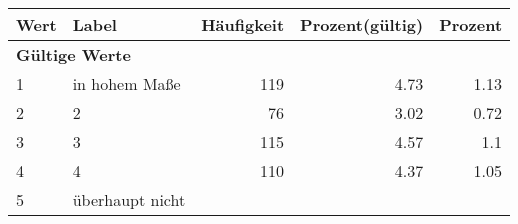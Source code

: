      \begin{longtable}{lXrrr}
     \toprule
     \textbf{Wert} & \textbf{Label} & \textbf{Häufigkeit} & \textbf{Prozent(gültig)} & \textbf{Prozent} \\
     \endhead
     \midrule
     \multicolumn{5}{l}{\textbf{Gültige Werte}}\\

     1 &
     \multicolumn{1}{X}{ in hohem Maße   } &


       \num{119} &
       \num[round-mode=places,round-precision=2]{4.73} &
         \num[round-mode=places,round-precision=2]{1.13} \\

     2 &
     \multicolumn{1}{X}{ 2   } &


       \num{76} &
       \num[round-mode=places,round-precision=2]{3.02} &
         \num[round-mode=places,round-precision=2]{0.72} \\

     3 &
     \multicolumn{1}{X}{ 3   } &


       \num{115} &
       \num[round-mode=places,round-precision=2]{4.57} &
         \num[round-mode=places,round-precision=2]{1.1} \\

     4 &
     \multicolumn{1}{X}{ 4   } &


       \num{110} &
       \num[round-mode=places,round-precision=2]{4.37} &
         \num[round-mode=places,round-precision=2]{1.05} \\

     5 &
     \multicolumn{1}{X}{ überhaupt nicht   } &



\end{longtable}
